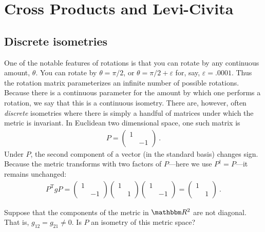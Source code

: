 \documentclass[12pt, oneside]{report}    %
\let\oldsection\section
\def\section{%
  \setcounter{sidenote}{1}%
  \oldsection
}
\begin{document}
\section{Cross Products and Levi-Civita}



\begin{subappendices}

\section{Discrete isometries}
\label{sec:discrete:isometries}

One of the notable features of rotations is that you can rotate by any continuous amount, $\theta$. You can rotate by $\theta=\pi/2$, or $\theta = \pi/2 + \varepsilon$ for, say, $\varepsilon = .0001$. Thus the rotation matrix parameterizes an infinite number of possible rotations. Because there is a continuous parameter for the amount by which one performs a rotation, we say that this is a continuous isometry. There are, however, often \emph{discrete} isometries where there is simply a handful of matrices under which the metric is invariant. In Euclidean two dimensional space, one such matrix is 
\begin{align}
    P = \begin{pmatrix}
        1 & \\
        & -1 
    \end{pmatrix} \ .
\end{align}
Under $P$, the second component of a vector (in the standard basis) changes sign. Because the metric transforms with two factors of $P$---here we use $P^\dag = P$---it remains unchanged:
\begin{align}
    P^\text{T}gP = 
    \begin{pmatrix}
        1 & \\ 
        & -1 
    \end{pmatrix}
    \begin{pmatrix}
        1 & \\ 
        & 1 
    \end{pmatrix}
    \begin{pmatrix}
        1 & \\ 
        & -1 
    \end{pmatrix}
    = 
    \begin{pmatrix}
        1 & \\ 
        & 1 
    \end{pmatrix} \ .
\end{align}
\begin{exercise}
Suppose that the components of the metric in $\RR^2$ are not diagonal. That is, $g_{12} = g_{21}\neq 0$. Is $P$ an isometry of this metric space?
\end{exercise}


\end{subappendices}
\end{document}
